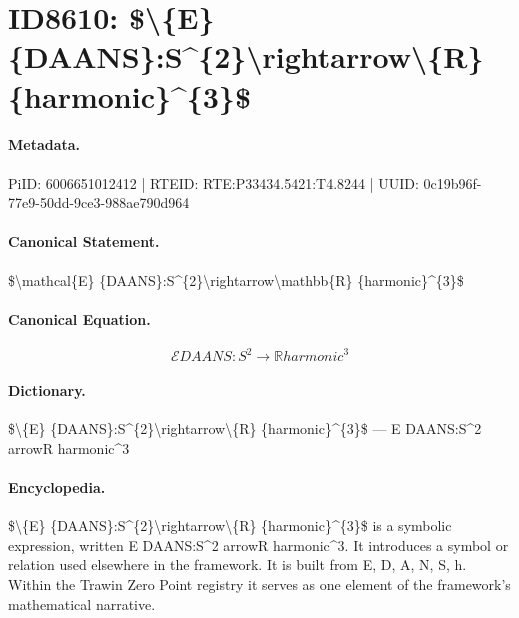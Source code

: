 \section*{ID8610: \$\textbackslash{}\{E\} \{DAANS\}:S\textasciicircum{}\{2\}\textbackslash{}rightarrow\textbackslash{}\{R\} \{harmonic\}\textasciicircum{}\{3\}\$}
\paragraph{Metadata.}
PiID: 6006651012412 | RTEID: RTE:P33434.5421:T4.8244 | UUID: 0c19b96f-77e9-50dd-9ce3-988ae790d964

\paragraph{Canonical Statement.}
\$\textbackslash{}mathcal\{E\} \{DAANS\}:S\textasciicircum{}\{2\}\textbackslash{}rightarrow\textbackslash{}mathbb\{R\} \{harmonic\}\textasciicircum{}\{3\}\$

\paragraph{Canonical Equation.}
\[
\mathcal{E} {DAANS}:S^{2}\rightarrow\mathbb{R} {harmonic}^{3}
\]

\paragraph{Dictionary.}
\$\textbackslash{}\{E\} \{DAANS\}:S\textasciicircum{}\{2\}\textbackslash{}rightarrow\textbackslash{}\{R\} \{harmonic\}\textasciicircum{}\{3\}\$ — E DAANS:S\textasciicircum{}2 arrowR harmonic\textasciicircum{}3

\paragraph{Encyclopedia.}
\$\textbackslash{}\{E\} \{DAANS\}:S\textasciicircum{}\{2\}\textbackslash{}rightarrow\textbackslash{}\{R\} \{harmonic\}\textasciicircum{}\{3\}\$ is a symbolic expression, written E DAANS:S\textasciicircum{}2 arrowR harmonic\textasciicircum{}3. It introduces a symbol or relation used elsewhere in the framework. It is built from E, D, A, N, S, h. Within the Trawin Zero Point registry it serves as one element of the framework's mathematical narrative.

